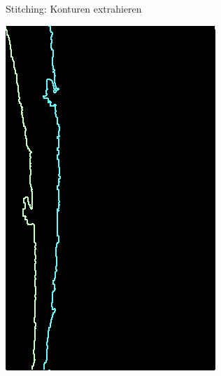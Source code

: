 \documentclass[../slides.tex]{subfiles}
\begin{document}
\begin{frame}{Stitching: Konturen extrahieren}
    \centering
    \begin{minipage}[H]{.2\textwidth}
        \centering
        \includegraphics[width=\textwidth]{img_niklas/0_match.png}
    \end{minipage}
    \begin{minipage}[H]{.15\textwidth}
        \centering

\end{minipage}
\end{frame}
\end{document}

